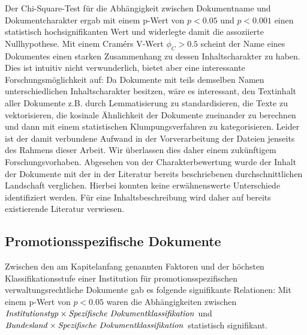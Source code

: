Der Chi-Square-Test für die Abhängigkeit zwischen Dokumentname und Dokumentcharakter ergab mit einem p-Wert von $p<\num{0.05}$ und $p<\num{0.001}$ einen statistisch hochsignifikanten Wert und widerlegte damit die assoziierte Nullhypothese.
Mit einem Cramérs V-Wert $\phi_C>\num{0,5}$ scheint der Name eines Dokumentes einen starken Zusammenhang zu dessen Inhaltscharakter zu haben.
Dies ist intuitiv nicht verwunderlich, bietet aber eine interessante Forschungsmöglichkeit auf:
Da Dokumente mit teils demselben Namen unterschiedlichen Inhaltscharakter besitzen, wäre es interessant, den Textinhalt aller Dokumente z.B. durch Lemmatisierung zu standardisieren, die Texte zu vektorisieren, die kosinale Ähnlichkeit der Dokumente zueinander zu berechnen und dann mit einem statistischen Klumpungsverfahren zu kategorisieren.
Leider ist der damit verbundene Aufwand in der Vorverarbeitung der Dateien jenseits des Rahmens dieser Arbeit.
Wir überlassen dies daher einem zukünftigem Forschungsvorhaben.
Abgesehen von der Charakterbewertung wurde der Inhalt der Dokumente mit der in der Literatur bereits beschriebenen durchschnittlichen Landschaft verglichen.
Hierbei konnten keine erwähnenswerte Unterschiede identifiziert werden.
Für eine Inhaltsbeschreibung wird daher auf bereits existierende Literatur verwiesen.~\autocite{Hiemenz2018-fdm-title,Hiemenz2018-fdm-report}

\subsection{Promotionsspezifische Dokumente}
Zwischen den am Kapitelanfang genannten Faktoren und der höchsten Klassifikationsstufe einer Institution für promotionsspezifischen verwaltungsrechtliche Dokumente gab es folgende signifikante Relationen:
Mit einem p-Wert von $p<\num{0,05}$ waren die Abhängigkeiten zwischen $\text{\textit{Institutionstyp}}\times\text{\textit{Spezifische Dokumentklassifikation}}$ und $\text{\textit{Bundesland}}\times\text{\textit{Spezifische Dokumentklassifikation}}$ statistisch signifikant.




